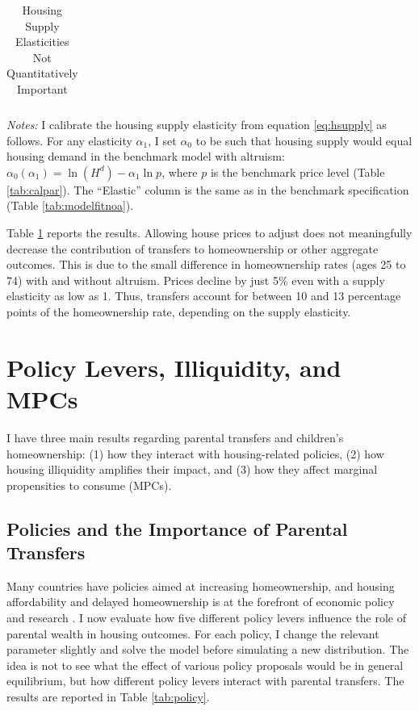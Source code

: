 \documentclass[12pt]{article}
\begin{document}
\begin{table}
	\center 
	\begin{threeparttable}
		\caption{Housing Supply Elasticities Not Quantitatively Important}\label{tab:quant_endogenprices}
		
		\begin{tabular}{@{}llll@{}}
			
		\end{tabular}
		
	\end{threeparttable}
	{\begin{footnotesize}\begin{flushleft}\vspace{-0.1in}%
		\textit{Notes:} I calibrate the housing supply elasticity from equation \eqref{eq:hsupply} as follows. For any elasticity $\alpha_1$, I set $\alpha_0$ to be such that housing supply would equal housing demand in the benchmark model with altruism: $\alpha_0(\alpha_1) = \ln(H^d) - \alpha_1 \ln p$, where $p$ is the benchmark price level (Table \ref{tab:calpar}). The ``Elastic'' column is the same as in the benchmark specification (Table \ref{tab:modelfitnoa}).
	\end{flushleft}\end{footnotesize}}		
\end{table}

Table \ref{tab:quant_endogenprices} reports the results. Allowing house prices to adjust does not meaningfully decrease the contribution of transfers to homeownership or other aggregate outcomes. This is due to the small difference in homeownership rates (ages 25 to 74) with and without altruism. Prices decline by just 5\% even with a supply elasticity as low as 1. Thus, transfers account for between 10 and 13 percentage points of the homeownership rate, depending on the supply elasticity.

\section{Policy Levers, Illiquidity, and MPCs}\label{sec:pol}
I have three main results regarding parental transfers and children's homeownership: (1) how they interact with housing-related policies, (2) how housing illiquidity amplifies their impact, and (3) how they affect marginal propensities to consume (MPCs).

\subsection{Policies and the Importance of Parental Transfers}
Many countries have policies aimed at increasing homeownership, and housing affordability and delayed homeownership is at the forefront of economic policy and research \citep[see e.g.,][]{Mabille2020}. I now evaluate how five different policy levers influence the role of parental wealth in housing outcomes. For each policy, I change the relevant parameter slightly and solve the model before simulating a new distribution. The idea is not to see what the effect of various policy proposals would be in general equilibrium, but how different policy levers interact with parental transfers. The results are reported in Table \ref{tab:policy}. 
\end{document}
